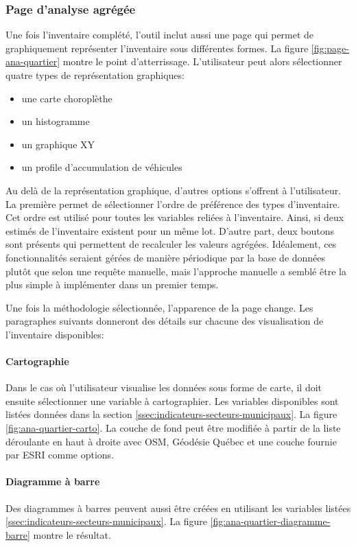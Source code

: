 \subsubsection{Page d'analyse agrégée}
Une fois l'inventaire complété, l'outil inclut aussi une page qui permet de graphiquement représenter l'inventaire sous différentes formes. La figure \ref{fig:page-ana-quartier} montre le point d’atterrissage. L'utilisateur peut alors sélectionner quatre types de représentation graphiques:
\begin{itemize}
    \item une carte choroplèthe
    \item un histogramme
    \item un graphique XY
    \item un profile d'accumulation de véhicules
\end{itemize}
Au delà de la représentation graphique, d'autres options s'offrent à l'utilisateur. La première permet de sélectionner l'ordre de préférence des types d'inventaire. Cet ordre est utilisé pour toutes les variables reliées à l'inventaire. Ainsi, si deux estimés de l'inventaire existent pour un même lot. D'autre part, deux boutons sont présents qui permettent de recalculer les valeurs agrégées. Idéalement, ces fonctionnalités seraient gérées de manière périodique par la base de données plutôt que selon une requête manuelle, mais l'approche manuelle a semblé être la plus simple à implémenter dans un premier temps.\par
Une fois la méthodologie sélectionnée, l'apparence de la page change. Les paragraphes suivants donneront des détails sur chacune des visualisation de l'inventaire disponibles:
\paragraph{Cartographie} Dans le cas où l'utilisateur visualise les données sous forme de carte, il doit ensuite sélectionner une variable à cartographier. Les variables disponibles sont listées données dans la section \ref{ssec:indicateurs-secteurs-municipaux}. La figure \ref{fig:ana-quartier-carto}. La couche de fond peut être modifiée à partir de la liste déroulante en haut à droite avec \ac{OSM}, Géodésie Québec et une couche fournie par \ac{ESRI} comme options.
\paragraph{Diagramme à barre} Des diagrammes à barres peuvent aussi être créées en utilisant les variables listées \ref{ssec:indicateurs-secteurs-municipaux}. La figure \ref{fig:ana-quartier-diagramme-barre} montre le résultat.
